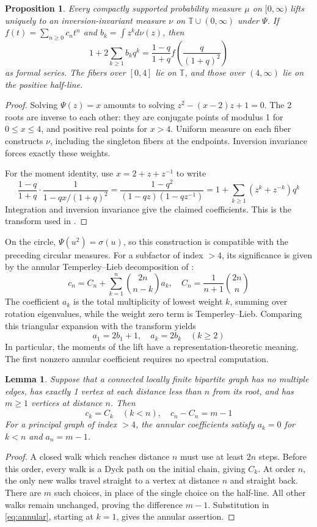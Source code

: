 \documentclass[11pt,reqno]{amsart}
\newtheorem{prop}[thm]{Proposition}
\newtheorem{lemma}[thm]{Lemma}
\theoremstyle{definition}
\numberwithin{equation}{section}
\begin{document}
\begin{prop}\label{prop:lift}
Every compactly supported probability measure $\mu$ on $[0,\infty)$ lifts uniquely to an inversion-invariant measure $\nu$ on $\mathbb T\cup(0,\infty)$ under $\Psi$. If $f(t)=\sum_{n\geq0}c_nt^n$ and $b_k=\int z^kd\nu(z)$, then
$$1+2\sum_{k\geq1}b_kq^k=\frac{1-q}{1+q}f\left(\frac q{(1+q)^2}\right)$$
as formal series. The fibers over $[0,4]$ lie on $\mathbb T$, and those over $(4,\infty)$ lie on the positive half-line.
\end{prop}
\begin{proof}
Solving $\Psi(z)=x$ amounts to solving $z^2-(x-2)z+1=0$. The 2 roots are inverse to each other: they are conjugate points of modulus 1 for $0\leq x\leq4$, and positive real points for $x>4$. Uniform measure on each fiber constructs $\nu$, including the singleton fibers at the endpoints. Inversion invariance forces exactly these weights.

For the moment identity, use $x=2+z+z^{-1}$ to write
$$\frac{1-q}{1+q}\cdot\frac1{1-qx/(1+q)^2}=\frac{1-q^2}{(1-qz)(1-qz^{-1})}=1+\sum_{k\geq1}(z^k+z^{-k})q^k$$
Integration and inversion invariance give the claimed coefficients. This is the transform used in \cite{BB07,Ban09}.
\end{proof}

On the circle, $\Psi(u^2)=\sigma(u)$, so this construction is compatible with the preceding circular measures. For a subfactor of index $>4$, its significance is given by the annular Temperley--Lieb decomposition of \cite{Jon01}:
\begin{equation}\label{eq:annular}
c_n=C_n+\sum_{k=1}^n\binom{2n}{n-k}a_k,\quad C_n=\frac1{n+1}\binom{2n}n
\end{equation}
The coefficient $a_k$ is the total multiplicity of lowest weight $k$, summing over rotation eigenvalues, while the weight zero term is Temperley--Lieb. Comparing this triangular expansion with the transform yields
$$a_1=2b_1+1,\quad a_k=2b_k\quad(k\geq2)$$
In particular, the moments of the lift have a representation-theoretic meaning. The first nonzero annular coefficient requires no spectral computation.

\begin{lemma}\label{prop:first-branch}
Suppose that a connected locally finite bipartite graph has no multiple edges, has exactly 1 vertex at each distance less than $n$ from its root, and has $m\geq1$ vertices at distance $n$. Then
$$c_k=C_k\quad(k<n),\quad c_n-C_n=m-1$$
For a principal graph of index $>4$, the annular coefficients satisfy $a_k=0$ for $k<n$ and $a_n=m-1$.
\end{lemma}
\begin{proof}
A closed walk which reaches distance $n$ must use at least $2n$ steps. Before this order, every walk is a Dyck path on the initial chain, giving $C_k$. At order $n$, the only new walks travel straight to a vertex at distance $n$ and straight back. There are $m$ such choices, in place of the single choice on the half-line. All other walks remain unchanged, proving the difference $m-1$. Substitution in \eqref{eq:annular}, starting at $k=1$, gives the annular assertion.
\end{proof}
\end{document}
